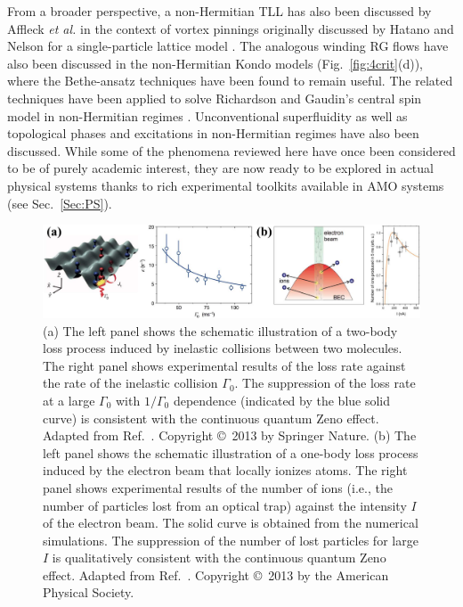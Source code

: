 \documentclass{tADP2e}
\theoremstyle{plain}
\theoremstyle{plain}
\theoremstyle{definition}
\begin{document}
From a broader perspective, a non-Hermitian TLL  has also been discussed by Affleck \emph{et al.} \cite{IA04} in the context of  vortex pinnings originally discussed by Hatano and Nelson for a single-particle lattice model \cite{HN96}. The analogous winding RG flows have also been discussed in the non-Hermitian Kondo models \cite{LAS18,NM18,Yoshi20}  (Fig.~\ref{fig:4crit}(d)), where the Bethe-ansatz techniques have been found to remain useful. The related techniques have been applied to solve Richardson and Gaudin's central spin model \cite{MG76,RWR63} in non-Hermitian regimes \cite{RDA18}. Unconventional superfluidity \cite{GA18,YK19} as well as topological phases and excitations \cite{SJP16,ZQB16,SN19,YT192,GC19} in non-Hermitian regimes have also been discussed.
While some of the  phenomena reviewed here have once been considered to be of purely academic interest, they are now ready to be explored in actual physical systems thanks to rich experimental toolkits available in AMO systems (see Sec.~\ref{Sec:PS}).

\begin{figure}[t]
\begin{center}
\includegraphics[width=13cm]{./Figures/fig_4_exp.pdf}
\end{center}
\caption{(a) The left panel shows the schematic illustration of a two-body loss process induced by inelastic collisions between two molecules. The right panel shows experimental results of the loss rate against the rate of the inelastic collision $\Gamma_0$. The suppression of the loss rate at a large $\Gamma_0$ with $1/\Gamma_0$ dependence (indicated by the blue solid curve) is consistent with the continuous quantum Zeno effect. Adapted from Ref.~\cite{YB13}. Copyright \copyright\,   2013 by Springer Nature. 
(b) The left panel shows the schematic illustration of a one-body loss process induced by the electron beam that locally ionizes atoms. The right panel shows experimental results of the number of ions (i.e., the number of particles lost from an optical trap) against the intensity $I$ of the electron beam. The solid curve is obtained from the numerical simulations. The suppression of the number of lost particles for large $I$ is qualitatively consistent with the continuous quantum Zeno effect.  Adapted from Ref.~\cite{BG13}. Copyright \copyright\,  2013 by the American Physical Society.}
\label{fig:4exp}
\end{figure}
\end{document}
